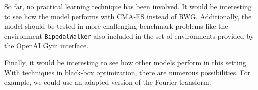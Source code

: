 So far, no practical learning technique has been involved. It would be interesting to see how the model performs with CMA-ES instead of RWG. Additionally, the model should be tested in more challenging benchmark problems like the environment \verb|BipedalWalker| also included in the set of environments provided by the OpenAI Gym interface.

Finally, it would be interesting to see how other models perform in this setting. With techniques in black-box optimization, there are numerous possibilities. For example, we could use an adapted version of the Fourier transform.
